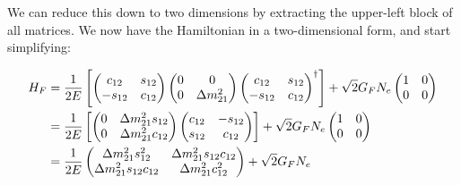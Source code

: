 We can reduce this down to two dimensions by extracting the upper-left block of all matrices. We now have the Hamiltonian in a two-dimensional form, and start simplifying:

\begin{align}
    H_F
        &= \frac{1}{2E}\left[
            \begin{pmatrix}
                c_{12} & s_{12} \\ 
                -s_{12} & c_{12} \\ 
            \end{pmatrix}  
            \begin{pmatrix}
            0 & 0 \\
            0 & \dm_{21}
        \end{pmatrix} 
        \begin{pmatrix}
            c_{12} & s_{12}\\ 
            -s_{12} & c_{12} \end{pmatrix}^\dagger \right] + \sqrt{2}G_F N_e 
            \begin{pmatrix}
            1 & 0 \\
            0 & 0 \\
        \end{pmatrix} \nonumber \\
        &= 
        \frac{1}{2E}\left[
            \begin{pmatrix}
                0 & \dm_{21} s_{12} \\ 
                0 & \dm_{21} c_{12} \\ 
            \end{pmatrix}  
        \begin{pmatrix}
            c_{12} & -s_{12}\\ 
            s_{12} & c_{12} \end{pmatrix} \right] + \sqrt{2}G_F N_e 
            \begin{pmatrix}
            1 & 0 \\
            0 & 0 \\
        \end{pmatrix} \nonumber \\
        &= 
        \frac{1}{2E}
            \begin{pmatrix}
                \dm_{21} s_{12}^2 & \dm_{21} s_{12}c_{12} \\ 
                \dm_{21} s_{12}c_{12} & \dm_{21} c_{12}^2 \\ 
            \end{pmatrix} + \sqrt{2}G_F N_e 

\end{align}
